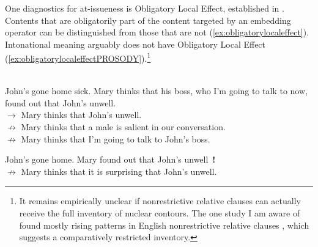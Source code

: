 One diagnostics for at-issueness is Obligatory Local Effect, established in \citet{TonhauserBeaverRobertsSimons.2013taxonomy}. Contents that are obligatorily part of the content targeted by an embedding operator can be distinguished from those that are not (\ref{ex:obligatorylocaleffect}). Intonational meaning arguably does not have Obligatory Local Effect (\ref{ex:obligatorylocaleffectPROSODY}).\footnote{It remains empirically unclear if nonrestrictive relative clauses can actually receive the full inventory of nuclear contours. The one study I am aware of found mostly rising patterns in English nonrestrictive relative clauses \citep{GarroParker.1982}, which suggests a comparatively restricted inventory.} 

\begin{exe}
	\ex \citep[280]{BeaverRobertsSimonsTonhauser.2017}  \label{ex:obligatorylocaleffect}\\
	John’s gone home sick. Mary thinks that his boss, who I’m going to talk to now, found out that John’s unwell.\\
	$\rightarrow$ Mary thinks that John’s unwell.\\
	$\not\rightarrow$ Mary thinks that a male is salient in our conversation.\\
	$\not\rightarrow$ Mary thinks that I’m going to talk to John’s boss.
	
	\ex \label{ex:obligatorylocaleffectPROSODY}
	John’s gone home. Mary found out that John’s unwell~\textbf{!} \\
	$\not\rightarrow$ Mary thinks that it is surprising that John's unwell.
\end{exe}

